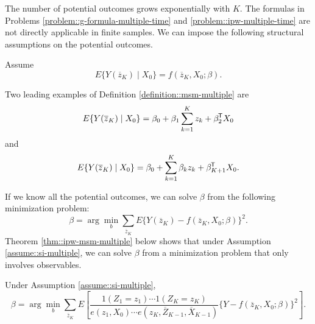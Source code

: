 \begin{HomeworkProblem}\label{exr:29-9}


The number of potential outcomes grows exponentially with $K$. The formulas in Problems \ref{problem::g-formula-multiple-time} and \ref{problem::ipw-multiple-time} are not directly applicable in finite samples. We can impose the following structural assumptions on the potential outcomes.


\begin{definition}
\label{definition::msm-multiple}
Assume
\[
  E\{ Y(\overline{z}_K)  \mid X_0\}  = f(\overline{z}_K, X_0 ; \beta  ).
\]
\end{definition}


Two leading examples of Definition \ref{definition::msm-multiple} are
\[
  E\{ Y(\overline{z}_K)  \mid X_0\}   = \beta_0 + \beta_1 \sum_{k=1}^K z_k + \beta_2^{\mkern-1.5mu\mathsf{T}} X_0
  \]
and
\[
 E\{ Y(\overline{z}_K)  \mid X_0\}   = \beta_0 +  \sum_{k=1}^K \beta_k z_k + \beta_{K+1}^{\mkern-1.5mu\mathsf{T}} X_0 .
 \]

If we know all the potential outcomes, we can solve $\beta$ from the following minimization problem:
\[
\beta = \arg \min_b  \sum_{  \overline{z}_K  }  E\{   Y(\overline{z}_K) -  f(\overline{z}_K, X_0 ; \beta  )\}^2.
\]
Theorem \ref{thm::ipw-msm-multiple} below shows that under Assumption \ref{assume::si-multiple}, we can solve $\beta$ from a minimization problem that only involves observables.


\begin{Theorem}\label{thm::ipw-msm-multiple}
Under Assumption \ref{assume::si-multiple},
\[
\beta = \arg \min_b  \sum_{  \overline{z}_K  }    E\left[
  \frac{1(Z_1 = z_1) \cdots 1( Z_K = z_K) }{    e(z_1, X_0)  \cdots  e(z_K, \overline{Z}_{K-1},  \overline{X}_{K-1})    }
  \{ Y -  f(\overline{z}_K, X_0 ; \beta  )\} ^2
  \right] .
\]
\end{Theorem}




\end{HomeworkProblem}


